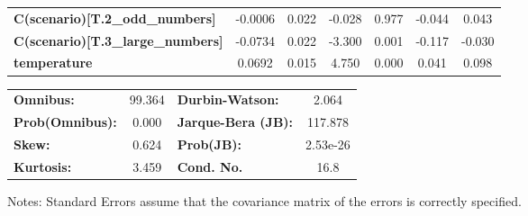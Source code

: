 \begin{center}
\begin{tabular}{lcccccc}
\textbf{C(scenario)[T.2\_odd\_numbers]}   &      -0.0006  &        0.022     &    -0.028  &         0.977        &       -0.044    &        0.043     \\
\textbf{C(scenario)[T.3\_large\_numbers]} &      -0.0734  &        0.022     &    -3.300  &         0.001        &       -0.117    &       -0.030     \\
\textbf{temperature}                      &       0.0692  &        0.015     &     4.750  &         0.000        &        0.041    &        0.098     \\
\bottomrule
\end{tabular}
\begin{tabular}{lclc}
\textbf{Omnibus:}       & 99.364 & \textbf{  Durbin-Watson:     } &    2.064  \\
\textbf{Prob(Omnibus):} &  0.000 & \textbf{  Jarque-Bera (JB):  } &  117.878  \\
\textbf{Skew:}          &  0.624 & \textbf{  Prob(JB):          } & 2.53e-26  \\
\textbf{Kurtosis:}      &  3.459 & \textbf{  Cond. No.          } &     16.8  \\
\bottomrule
\end{tabular}
\end{center}

Notes: \newline
 [1] Standard Errors assume that the covariance matrix of the errors is correctly specified.